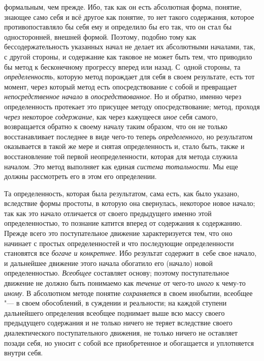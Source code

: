 формальным, чем прежде. Ибо, так как он есть абсолютная форма, понятие,
знающее само себя и всё другое как понятие, то нет такого содержания,
которое противопоставляло бы себя ему и определило бы его так, что он стал
бы односторонней, внешней формой. Поэтому, подобно тому как
бессодержательность указанных начал не делает их абсолютными началами, так,
с другой стороны, и содержание как таковое не может быть
тем, что приводило бы метод к бесконечному прогрессу вперед или назад.
С~одной стороны, та {\em определенность},
которую метод порождает для себя в своем результате, есть тот
момент, через который метод есть опосредствование с собой и превращает
{\em непосредственное начало} в {\em опосредствованное}.
Но и обратно, именно через определенность протекает это
присущее методу опосредствование; метод, проходя
{\em через} некоторое {\em содержание}, как через кажущееся {\em иное}
себя самого, возвращается обратно к своему началу таким
образом, что он не только восстанавливает последнее в виде чего-то теперь
{\em определенного}, но
результатом оказывается в такой же мере и снятая определенность и, стало
быть, также и восстановление той первой неопределенности, которая для
метода служила началом. Это метод выполняет как единая
{\em система тотальности}.
Мы еще должны рассмотреть его в этом его определении.

Та определенность, которая была результатом, сама есть, как
было указано, вследствие формы простоты, в которую она свернулась,
некоторое новое начало; так как это начало отличается от своего предыдущего
именно этой определенностью, то познание катится вперед от содержания к
содержанию. Прежде всего это поступательное движение характеризуется тем,
что оно начинает с простых определенностей и что последующие определенности
становятся все {\em богаче и
конкретнее}. Ибо результат содержит в~себе свое начало, и
дальнейшее движение этого начала обогатило его (начало) новой
определенностью. {\em Всеобщее}
составляет основу; поэтому поступательное движение не должно
быть понимаемо как {\em течение} от чего-то {\em иного} к
чему-то {\em иному}. В абсолютном методе понятие {\em сохраняется} в своем
инобытии, всеобщее "--- в своем обособлений, в суждении и
реальности; на каждой ступени дальнейшего определения всеобщее поднимает
выше всю массу своего предыдущего содержания и не только ничего не теряет
вследствие своего диалектического поступательного движения, не только
ничего не оставляет позади себя, но уносит с собой все приобретенное и
обогащается и уплотняется внутри себя.

